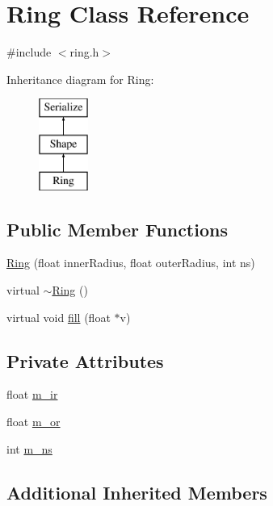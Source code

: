 \hypertarget{classRing}{\section{Ring Class Reference}
\label{classRing}
}


{\ttfamily \#include $<$ring.\-h$>$}

Inheritance diagram for Ring\-:\begin{figure}[H]
\begin{center}
\leavevmode
\includegraphics[height=3.000000cm]{classRing}
\end{center}
\end{figure}
\subsection*{Public Member Functions}
\begin{DoxyCompactItemize}
\item 
\hyperlink{classRing_a39d8bce00a532857c1f894355df655c1}{Ring} (float inner\-Radius, float outer\-Radius, int ns)
\item 
virtual \hyperlink{classRing_a515a41c0803bcdd921712d6f5047e101}{$\sim$\-Ring} ()
\item 
virtual void \hyperlink{classRing_ad5dd2b058f6690108fe62da9d6e88d53}{fill} (float $\ast$v)
\end{DoxyCompactItemize}
\subsection*{Private Attributes}
\begin{DoxyCompactItemize}
\item 
float \hyperlink{classRing_a5e4deb45ebf263e2a518d06df7f00afd}{m\-\_\-ir}
\item 
float \hyperlink{classRing_a4686fdcc73450cc4cb29dcd97908652c}{m\-\_\-or}
\item 
int \hyperlink{classRing_af2929b1d85186201b9325998d541d204}{m\-\_\-ns}
\end{DoxyCompactItemize}
\subsection*{Additional Inherited Members}


